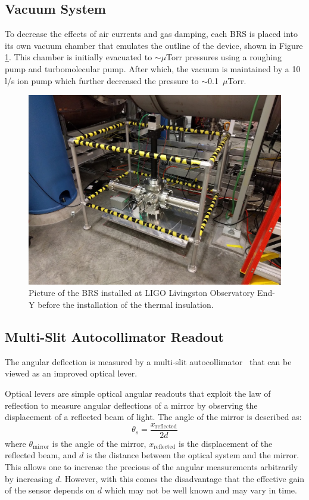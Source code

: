 \documentclass [12pt, proquest]{uwthesis}[2019]
\begin{document}
\subsection{Vacuum System}

To decrease the effects of air currents and gas damping, each BRS is placed into its own vacuum chamber that emulates the outline of the device, shown in Figure \ref{BRSPic}. This chamber is initially evacuated to $\sim \mu$Torr pressures using a roughing pump and turbomolecular pump. After which, the vacuum is maintained by a 10 l/s ion pump which further decreased the pressure to $\sim$0.1~$\mu$Torr.

\begin{figure}[!h]
\begin{center}
 \includegraphics[width=\textwidth]{BRSPic.jpg}
\caption[Picture of an installed BRS]{Picture of the BRS installed at LIGO Livingston Observatory End-Y before the installation of the thermal insulation.}
\label{BRSPic}
\end{center}
\end{figure}

\subsection{Multi-Slit Autocollimator Readout}

The angular deflection is measured by a multi-slit autocollimator~\cite{MSA} that can be viewed as an improved optical lever.

Optical levers are simple optical angular readouts that exploit the law of reflection to measure angular deflections of a mirror by observing the displacement of a reflected beam of light. The angle of the mirror is described as:
\begin{equation}
\theta_{s}=\frac{x_{\text{reflected}}}{2d}
\end{equation}
where $\theta_\text{mirror}$ is the angle of the mirror, $x_\text{reflected}$ is the displacement of the reflected beam, and $d$ is the distance between the optical system and the mirror. This allows one to increase the precious of the angular measurements arbitrarily by increasing $d$. However, with this comes the disadvantage that the effective gain of the sensor depends on $d$ which may not be well known and may vary in time.
\end{document}
